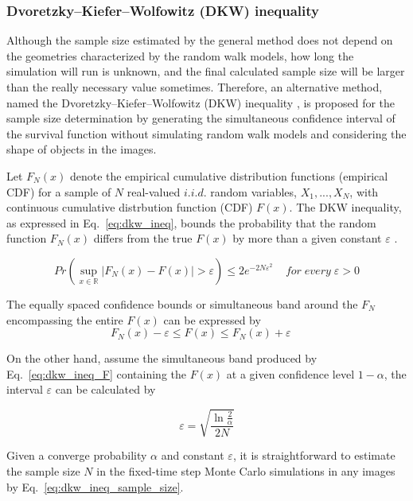 \subsubsection{Dvoretzky–Kiefer–Wolfowitz (DKW) inequality}

Although the sample size estimated by the general method does not
depend on the geometries characterized by the random walk models, how
long the simulation will run is unknown, and the final calculated
sample size will be larger than the really necessary value
sometimes. Therefore, an alternative method, named the
Dvoretzky–Kiefer–Wolfowitz (DKW)
inequality \cite{dvoretzky1956asymptotic}, is proposed for the sample
size determination by generating the simultaneous confidence interval
of the survival function without simulating random walk models and
considering the shape of objects in the images.

Let $F_N(x)$ denote the empirical cumulative distribution functions
(empirical CDF) for a sample of $N$ real-valued $i.i.d.$ random
variables, $X_{1}, ... , X_{N}$, with continuous cumulative
distrbution function (CDF) $F(x)$. The DKW inequality, as expressed in
Eq.~\ref{eq:dkw_ineq}, bounds the probability that the random function
$F_{N}(x)$ differs from the true $F(x)$ by more than a given constant
$\varepsilon$
\cite{dvoretzky1956asymptotic}.

\begin{equation}\label{eq:dkw_ineq}
  Pr(\sup_{x \in \mathbb{R}} |F_{N}(x) - F(x)| > \varepsilon) \leq
  2e^{-2N\varepsilon^2} \;\; \;\; for \; every \; \varepsilon > 0
\end{equation}

The equally spaced confidence bounds or simultaneous band around the
$F_{N}$ encompassing the entire $F(x)$ can be expressed by
\begin{equation}\label{eq:dkw_ineq_F}
  F_{N}(x) - \varepsilon \leq F(x) \leq F_N(x) + \varepsilon \; \; \; \; 
\end{equation}

On the other hand, assume the simultaneous band produced by
Eq.~\ref{eq:dkw_ineq_F} containing the $F(x)$ at a given confidence
level $1-\alpha$, the interval $\varepsilon$ can be calculated by

\begin{equation}\label{eq:dkw_ineq_sample_size}
  \varepsilon = \sqrt{\frac{\ln{\frac{2}{\alpha}}}{2N}}
\end{equation}


Given a converge probability $\alpha$ and constant $\varepsilon$, it
is straightforward to estimate the sample size $N$ in the fixed-time
step Monte Carlo simulations in any images by
Eq.~\ref{eq:dkw_ineq_sample_size}.

